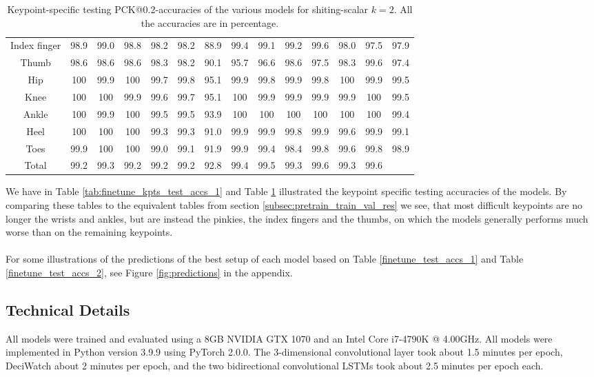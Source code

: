 \documentclass[./main.tex]{subfiles}
\begin{document}
\begin{table}[htbp]
\begin{adjustbox}{center}
\begin{tabular}{c||ccc|ccc|ccc|ccc|c}
            Index finger & 98.9 & 99.0 & 98.8 & 98.2 & 98.2 & 88.9 & 99.4 & 99.1 & 99.2 & 99.6 & 98.0 & 97.5 & 97.9 \\
            Thumb & 98.6 & 98.6 & 98.6 & 98.3 & 98.2 & 90.1 & 95.7 & 96.6 & 98.6 & 97.5 & 98.3 & 99.6 & 97.4 \\
            Hip & 100 & 99.9 & 100 & 99.7 & 99.8 & 95.1 & 99.9 & 99.8 & 99.9 & 99.8 & 100 & 99.9 & 99.5 \\
            Knee & 100 & 100 & 99.9 & 99.6 & 99.7 & 95.1 & 100 & 99.9 & 99.9 & 99.9 & 99.9 & 100 & 99.5 \\
            Ankle & 100 & 99.9 & 100 & 99.5 & 99.5 & 93.9 & 100 & 100 & 100 & 100 & 100 & 100 & 99.4 \\
            Heel & 100 & 100 & 100 & 99.3 & 99.3 & 91.0 & 99.9 & 99.9 & 99.8 & 99.9 & 99.6 & 99.9 & 99.1 \\
            Toes & 99.9 & 100 & 100 & 99.0 & 99.1 & 91.9 & 99.9 & 99.4 & 98.4 & 99.8 & 99.6 & 99.8 & 98.9 \\
            \hline
            Total & 99.2 & 99.3 & 99.2 & 99.2 & 99.2 & 92.8 & 99.4 & 99.5 & 99.3 & 99.6 & 99.3 & 99.6 & \\
            \hline
        \end{tabular}
        \caption{Keypoint-specific testing PCK@0.2-accuracies of the various models for shiting-scalar $k = 2$. All the accuracies are in percentage.}
        \label{tab:finetune_kpts_test_accs_2}
    \end{adjustbox}
\end{table}

\noindent We have in Table \ref{tab:finetune_kpts_test_accs_1} and Table \ref{tab:finetune_kpts_test_accs_2} illustrated the keypoint specific testing accuracies of the models. By comparing these tables to the equivalent tables from section \ref{subsec:pretrain_train_val_res} we see, that most difficult keypoints are no longer the wrists and ankles, but are instead the pinkies, the index fingers and the thumbs, on which the models generally performs much worse than on the remaining keypoints.
\\
\\
For some illustrations of the predictions of the best setup of each model based on Table \ref{finetune_test_accs_1} and Table \ref{finetune_test_accs_2}, see Figure \ref{fig:predictions} in the appendix.

\subsection{Technical Details}
\label{sec:finetune_tech_details}
All models were trained and evaluated using a 8GB NVIDIA GTX 1070 and an Intel Core i7-4790K @ 4.00GHz. All models were implemented in Python version 3.9.9 using PyTorch 2.0.0. The 3-dimensional convolutional layer took about 1.5 minutes per epoch, DeciWatch about 2 minutes per epoch, and the two bidirectional convolutional LSTMs took about 2.5 minutes per epoch each.
\end{document}

